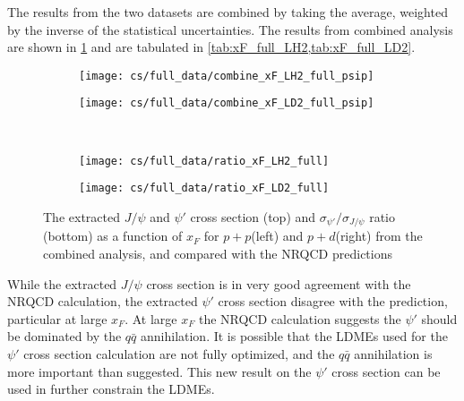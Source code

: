 \documentclass[../main.tex]{subfiles}
\begin{document}
The results from the two datasets are combined by taking the average, weighted by
the inverse of the statistical uncertainties.
The results from combined analysis are shown in \cref{fig:cs_xF_full} and are tabulated in
\cref{tab:xF_full_LH2,tab:xF_full_LD2}.
\begin{figure}
	\centering
	\begin{subfigure}{0.45\linewidth}
		\texttt{[image: cs/full\_data/combine\_xF\_LH2\_full\_psip]}
	\end{subfigure}
	\begin{subfigure}{0.45\linewidth}
		\texttt{[image: cs/full\_data/combine\_xF\_LD2\_full\_psip]}
	\end{subfigure}\\
	\begin{subfigure}{0.45\linewidth}
		\texttt{[image: cs/full\_data/ratio\_xF\_LH2\_full]}
	\end{subfigure}
	\begin{subfigure}{0.45\linewidth}
		\texttt{[image: cs/full\_data/ratio\_xF\_LD2\_full]}
	\end{subfigure}
	\caption{The extracted $J/\psi$ and $\psi'$ cross section (top) and $\sigma_{\psi'}/\sigma_{J/\psi}$
		ratio (bottom) as a function of $x_F$ for $p+p$(left) and $p+d$(right) from
		the combined analysis, and compared with the NRQCD predictions}
	\label{fig:cs_xF_full}
\end{figure}
\begin{table}[h!]
	\centering
	\caption{Cross section as a function of $x_F$ (in \unit{\nano\barn\per nucleon}) and the
		$\sigma_{\psi'}/\sigma_{J/\psi}$ ratio for $p+p$ extracted from the combined analysis, with
		their statistical and systematic uncertainties and the average $x_F$ in each bin.}
	
	\label{tab:xF_full_LH2}
\end{table}
\begin{table}[h!]
	\centering
	\caption{Cross section as a function of $x_F$ (in \unit{\nano\barn\per nucleon}) and the
		$\sigma_{\psi'}/\sigma_{J/\psi}$ ratio for $p+d$ extracted from the combined analysis, with
		their statistical and systematic uncertainties and the average $x_F$ in each bin.}
	
	\label{tab:xF_full_LD2}
\end{table}
While the extracted $J/\psi$ cross section is in very good agreement with the NRQCD calculation,
the extracted $\psi'$
cross section disagree with the prediction, particular at large $x_F$. At large $x_F$ the NRQCD
calculation suggests the $\psi'$ should be dominated by the $q\bar{q}$ annihilation.
It is possible that the LDMEs used  for the $\psi'$ cross section calculation are not fully optimized,
and the $q\bar{q}$ annihilation is more important than suggested. This new result on the $\psi'$
cross section can be used in further constrain the LDMEs.
\end{document}
